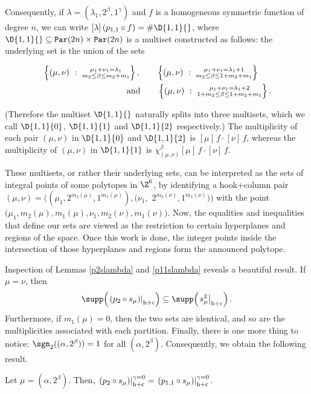 \documentclass[twoside]{article}
\renewcommand{\hc}[1]{\left.\left(#1\right)\right|_{\textnormal{h+c}}}
\newcommand{\hcS}[1]{\left.#1\right|_{\textnormal{h+c}}}
\renewcommand{\hcZ}[1]{\left.\left(#1\right)\right|_{\textnormal{h+c}}^{\gamma=0}}
\begin{document}
Consequently, if $\lambda = (\lambda_1, 2^\beta, 1^\gamma)$ and  $f$ is a homogeneous symmetric function of degree $n$, we can write $[\lambda] \, (p_{1,1}\circ f) = \#\D{1,1}{}$, where $\D{1,1}{}\subseteq\mathtt{Par}(2n)\times\mathtt{Par}(2n)$ is a multiset constructed as follows: the underlying set is the union of the sets
\begin{samepage}
    \begin{align*} %
    &\left\{(\mu,\nu)\ : \ \substack{\mu_1+\nu_1=\lambda_1\\ m_2\le\beta\le m_2+m_1}\right\},
    \qquad
    \left\{(\mu,\nu)\ : \ \substack{\mu_1+\nu_1=\lambda_1+1\\ m_2\le\beta\le 1+m_2+m_1}\right\}
    \\
    &\qquad \qquad \text{\qquad \qquad \qquad and} \qquad 
    \left\{(\mu,\nu)\ : \ \substack{\mu_1+\nu_1=\lambda_1+2\\ 1+m_2\le\beta\le 1+m_2+m_1}\right\}.
    \end{align*}
\end{samepage}
    (Therefore the multiset $\D{1,1}{}$ naturally splits into three multisets, which we call $\D{1,1}{0}$, $\D{1,1}{1}$ and $\D{1,1}{2}$ respectively.)
    The multiplicity of each pair $(\mu,\nu)$ in $\D{1,1}{0}$ and $\D{1,1}{2}$ is $[\mu]\, f\cdot [\nu] \, f$, whereas the multiplicity of $(\mu,\nu)$ in $\D{1,1}{1}$ is $\chi_{(\mu,\nu)}^\beta[\mu] \,f\cdot [\nu]\, f$.


\begin{Note}These multisets, or rather their underlying sets, can be interpreted as the sets of integral points of some polytopes in $\Z^6$, by identifying a hook+column pair $(\mu,\nu)=\big((\mu_1,2^{m_2(\mu)},1^{m_1(\mu)}),(\nu_1,$ $2^{m_2(\nu)},1^{m_1(\nu)})\big)$ with the point $\big(\mu_1,m_2(\mu),m_1(\mu),\nu_1,m_2(\nu),m_1(\nu)\big)$. Now, the equalities and inequalities that define our sets are viewed as the restriction to certain hyperplanes and regions of the space. Once this work is done, the integer points inside the intersection of those hyperplanes and regions form the announced polytope.
\end{Note}

Inspection of Lemmas \ref{p2slambda} and \ref{p11slambda} reveals a beautiful result. If $\mu = \nu$, then
\[\supp\!\left(\hc{p_2\circ s_\mu}\right)\subseteq\supp\!\left(\hcS{s_\mu^2}\right).\]
Furthermore, if $m_1(\mu)=0$, then the two sets are identical, and so are the multiplicities associated with each partition.
Finally, there is one more thing to notice: $\sgn_2((\alpha,2^\beta)) = 1$ for all $(\alpha, 2^\beta)$. Consequently, we obtain the following result.\begin{lem}\label{square} Let $\mu=(\alpha,2^\beta)$. Then, $\hcZ{p_2\circ s_\mu} = \hcZ{p_{1,1} \circ s_\mu}$.
\end{lem}
\end{document}
